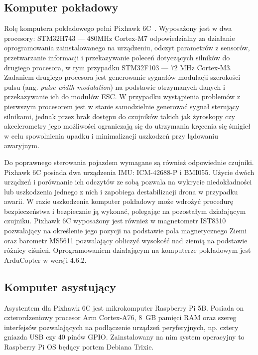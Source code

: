 \documentclass[a4paper,12pt]{book}
\begin{document}
        \subsection{Komputer pokładowy}
        Rolę komputera pokładowego pełni Pixhawk 6C~\cite{web:pixhawk6c:specs}. Wyposażony jest w dwa procesory: STM32H743 — 480MHz Cortex-M7 odpowiedzialny za działanie oprogramowania zainstalowanego na urządzeniu, 
        odczyt parametrów z sensorów, przetwarzanie informacji i przekazywanie poleceń dotyczących silników do drugiego procesora, w tym przypadku STM32F103 — 72 MHz Cortex-M3. Zadaniem 
        drugiego procesora jest generowanie sygnałów modulacji szerokości pulsu (ang. \textit{pulse-width modulation}) na podstawie otrzymanych danych i przekazywanie ich do modułów ESC. W przypadku wystąpienia problemów z pierwszym procesorem 
        jest w stanie samodzielnie generować sygnał sterujący silnikami, jednak przez brak dostępu do czujników takich jak żyroskopy czy akcelerometry jego możliwości ograniczają się do 
        utrzymania kręcenia się śmigieł w celu spowolnienia upadku i minimalizacji uszkodzeń przy lądowaniu awaryjnym.

        Do poprawnego sterowania pojazdem wymagane są również odpowiednie czujniki. Pixhawk 6C posiada dwa urządzenia IMU: ICM-42688-P i BMI055. 
        Użycie dwóch urządzeń i porównanie ich odczytów ze sobą pozwala na wykrycie niedokładności lub uszkodzenia jednego z nich i zapobiega destabilizacji drona w przypadku awarii. 
        W razie uszkodzenia komputer pokładowy może wdrożyć procedurę bezpieczeństwa i bezpiecznie ją wykonać, polegając na pozostałym działającym czujniku. Pixhawk 6C wyposażony jest również w 
        magnetometr IST8310 pozwalający na określenie jego pozycji na podstawie pola magnetycznego Ziemi oraz barometr MS5611 pozwalający obliczyć wysokość nad ziemią na podstawie różnicy \mbox{ciśnień\cite{web:pixhawk6c:specs}}.
        Oprogramowaniem działającym na komputerze pokładowym jest ArduCopter w wersji 4.6.2.
        \subsection{Komputer asystujący}
        Asystentem dla Pixhawk 6C jest mikrokomputer Raspberry Pi 5B. Posiada on czterordzeniowy procesor Arm Cortex-A76, 8~GB pamięci RAM oraz szereg interfejsów pozwalających na podłączenie urządzeń 
        peryferyjnych, np. cztery gniazda USB czy 40 pinów GPIO. Zainstalowany na nim system operacyjny to Raspberry Pi OS będący portem Debiana Trixie.
\end{document}
